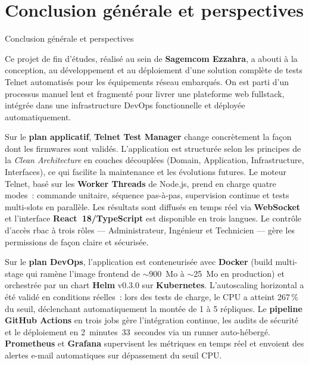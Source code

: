 \chapter*{Conclusion générale et perspectives}
         {Conclusion générale et perspectives}

Ce projet de fin d'études, réalisé au sein de \textbf{Sagemcom Ezzahra},
a abouti à la conception, au développement et au déploiement d'une
solution complète de tests Telnet automatisés pour les équipements réseau
embarqués. On est parti d'un processus manuel lent et fragmenté pour
livrer une plateforme web fullstack, intégrée dans une infrastructure
DevOps fonctionnelle et déployée automatiquement.

Sur le \textbf{plan applicatif}, \textbf{Telnet Test Manager} change
concrètement la façon dont les firmwares sont validés. L'application
est structurée selon les principes de la \textit{Clean Architecture}
en couches découplées (Domain, Application, Infrastructure, Interfaces),
ce qui facilite la maintenance et les évolutions futures. Le moteur
Telnet, basé sur les \textbf{Worker Threads} de Node.js, prend en
charge quatre modes~: commande unitaire, séquence pas-à-pas, supervision
continue et tests multi-slots en parallèle. Les résultats sont diffusés
en temps réel via \textbf{WebSocket} et l'interface \textbf{React~18/TypeScript}
est disponible en trois langues. Le contrôle d'accès \gls{rbac} à trois
rôles --- Administrateur, Ingénieur et Technicien --- gère les permissions
de façon claire et sécurisée.

Sur le \textbf{plan DevOps}, l'application est conteneurisée avec
\textbf{Docker} (build multi-stage qui ramène l'image frontend de
$\sim$900~Mo à $\sim$25~Mo en production) et orchestrée par un chart
\textbf{Helm} v0.3.0 sur \textbf{Kubernetes}. L'autoscaling horizontal
a été validé en conditions réelles~: lors des tests de charge, le CPU
a atteint 267\,\% du seuil, déclenchant automatiquement la montée de
1 à 5 répliques. Le \textbf{pipeline GitHub Actions} en trois jobs
gère l'intégration continue, les audits de sécurité et le déploiement
en 2~minutes~33~secondes via un runner auto-hébergé. \textbf{Prometheus}
et \textbf{Grafana} supervisent les métriques en temps réel et envoient
des alertes e-mail automatiques sur dépassement du seuil CPU.

